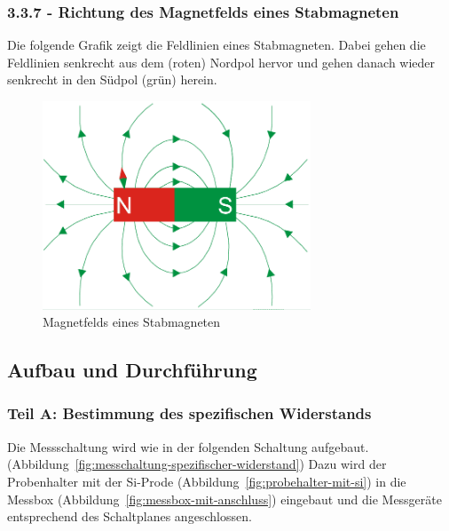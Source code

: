 \documentclass[a4paper]{scrartcl}
\numberwithin{equation}{subsection}
\begin{document}

\subsubsection{3.3.7 - Richtung des Magnetfelds eines Stabmagneten}
Die folgende Grafik zeigt die Feldlinien eines Stabmagneten. Dabei gehen die Feldlinien senkrecht aus dem (roten) Nordpol hervor und gehen danach wieder senkrecht in den Südpol (grün) herein.

\begin{figure}[H]
\includegraphics[width=8cm]{stabmagnet}
\centering
\caption{Magnetfelds eines Stabmagneten \protect\footnotemark}
\centering
\label{fig:stabmagnet}
\end{figure}


\newpage

\subsection{Aufbau und Durchführung}
\subsubsection{Teil A: Bestimmung des spezifischen Widerstands}

Die Messschaltung wird wie in der folgenden Schaltung aufgebaut. (Abbildung~\ref{fig:messchaltung-spezifischer-widerstand})
Dazu wird der Probenhalter mit der Si-Prode (Abbildung~\ref{fig:probehalter-mit-si}) in die Messbox (Abbildung~\ref{fig:messbox-mit-anschluss}) eingebaut und die Messgeräte entsprechend des Schaltplanes angeschlossen.
\end{document}
